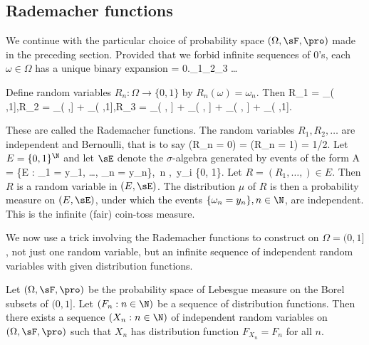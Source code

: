 
\subsection{Rademacher functions}\label{subsec:rademacher_function}

We continue with the particular choice of probability space $(\Omega, \sF, \pro)$ made in the preceding section. Provided that we forbid infinite sequences of 0's, each $\omega \in \Omega$ has a unique binary expansion
\be
\omega = 0.\omega_1\omega_2\omega_3 \dots
\ee

Define random variables $R_n : \Omega \to \{0, 1\}$ by $R_n(\omega) = \omega_n$. Then
\be
R_1 = \ind_{( ,1]},\quad R_2 = \ind_{( ,]} + \ind_{( ,1]},\quad R_3 = \ind_{(  , ]} + \ind_{(  ,  ]} + \ind_{( , ]} + \ind_{(  ,1]}.
\ee

These are called the Rademacher functions. The random variables $R_1,R_2, \dots$ are independent and Bernoulli, that is to say
\be
\pro(R_n = 0) = \pro(R_n = 1) = 1/2.
\ee
Let $E = \{0, 1\}^\N$ and let $\sE$ denote the $\sigma$-algebra generated by events of the form
\be
A = \{\omega \in E : \omega_1 = y_1, \dots, \omega_n = y_n\},\ n \in \N,\ y_i \in \{0, 1\}.
\ee
Let $R = (R_1, \dots, ) \in E$. Then $R$ is a random variable in $(E,\sE)$. The distribution $\mu$ of $R$ is then a probability measure on $(E,\sE)$, under which the events $\{\omega_n = y_n\}, n \in \N$, are independent. This is the infinite (fair) coin-toss measure.

We now use a trick involving the Rademacher functions to construct on $\Omega = (0, 1]$, not just one random variable, but an infinite sequence of independent random variables with given distribution functions.

\begin{proposition}
Let $(\Omega, \sF, \pro)$ be the probability space of Lebesgue measure on the Borel subsets of $(0, 1]$. Let $(F_n : n \in \N)$ be a sequence of distribution functions. Then there exists a sequence $(X_n : n \in \N)$ of independent random variables on $(\Omega, \sF, \pro)$ such that $X_n$ has distribution function $F_{X_n} = F_n$ for all $n$.
\end{proposition}

